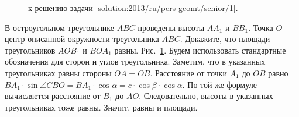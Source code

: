 \ifsolution
\begin{figure}\centering
    \caption{к решению задачи \ref{solution:2013/ru/pers-geomt/senior/1}.}
    \label{fig:solution:2013/ru/pers-geomt/senior/1}
\end{figure}%
\fi %

\problem
В остроугольном треугольнике $ABC$ проведены высоты $A A_1$ и $B B_1$.
Точка $O$~--- центр описанной окружности треугольника $ABC$.
Докажите, что площади треугольников $A O B_1$ и $B O A_1$ равны.
\solution
\label{solution:2013/ru/pers-geomt/senior/1}
Рис.~\ref{fig:solution:2013/ru/pers-geomt/senior/1}.
Будем использовать стандартные обозначения для сторон и углов треугольника.
Заметим, что в указанных треугольниках равны стороны $OA = OB$.
Расстояние от точки $A_1$ до $OB$ равно
\(
    B A_1 \cdot \sin \angle CBO
=
    B A_1 \cdot \cos \alpha
=
    c \cdot \cos \beta \cdot \cos \alpha
\).
По той же формуле вычисляется расстояние от $B_1$ до $AO$.
Следовательно, высоты в указанных треугольниках тоже равны.
Значит, равны и площади.
\endproblem
